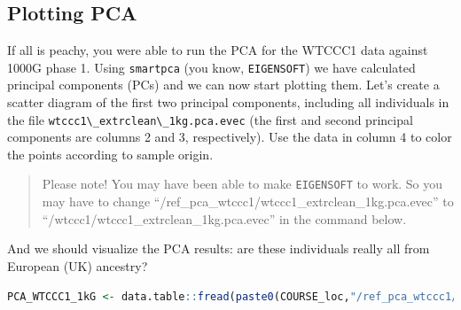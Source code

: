 \documentclass[
]{book}
\newcommand{\passthrough}[1]{#1}
\begin{document}
\hypertarget{plotting-pca}{%
\subsection{Plotting PCA}\label{plotting-pca}}

If all is peachy, you were able to run the PCA for the WTCCC1 data against 1000G phase 1. Using \passthrough{\lstinline!smartpca!} (you know, \passthrough{\lstinline!EIGENSOFT!}) we have calculated principal components (PCs) and we can now start plotting them. Let's create a scatter diagram of the first two principal components, including all individuals in the file \passthrough{\lstinline!wtccc1\_extrclean\_1kg.pca.evec!} (the first and second principal components are columns 2 and 3, respectively). Use the data in column 4 to color the points according to sample origin.

\begin{quote}
Please note! You may have been able to make \passthrough{\lstinline!EIGENSOFT!} to work. So you may have to change ``/ref\_pca\_wtccc1/wtccc1\_extrclean\_1kg.pca.evec'' to ``/wtccc1/wtccc1\_extrclean\_1kg.pca.evec'' in the command below.
\end{quote}

And we should visualize the PCA results: are these individuals really all from European (UK) ancestry?

\begin{lstlisting}[language=R]
PCA_WTCCC1_1kG <- data.table::fread(paste0(COURSE_loc,"/ref_pca_wtccc1/wtccc1_extrclean_1kg.pca.evec"), header = FALSE, skip = 1)
\end{lstlisting}
\end{document}

